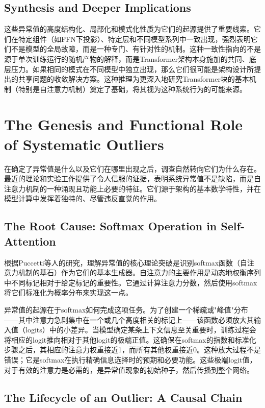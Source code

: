 \documentclass{article}
\begin{document}
\subsection{Synthesis and Deeper Implications}

这些异常值的高度结构化、局部化和模式化性质为它们的起源提供了重要线索。它们在特定组件（如FFN下投影）、特定层和不同模型系列中一致出现，强烈表明它们不是模型的全局故障，而是一种专门、有针对性的机制。这种一致性指向的不是源于单次训练运行的随机产物的解释，而是Transformer架构本身施加的共同、底层压力。如果相同的模式在不同模型中独立出现，那么它们很可能是架构设计所提出的共享问题的收敛解决方案。这种推理为更深入地研究Transformer块的基本机制（特别是自注意力机制）奠定了基础，将其视为这种系统行为的可能来源。

\section{The Genesis and Functional Role of Systematic Outliers}

在确定了异常值是什么以及它们在哪里出现之后，调查自然转向它们为什么存在。最近的理论和实验工作提供了令人信服的证据，表明系统异常值不是缺陷，而是自注意力机制的一种涌现且功能上必要的特征。它们源于架构的基本数学特性，并在模型计算中发挥着独特的、尽管违反直觉的作用。

\subsection{The Root Cause: Softmax Operation in Self-Attention}

根据Puccetti等人\cite{pucetti2021}的研究，理解异常值的核心理论突破是识别softmax函数（自注意力机制的基石）作为它们的基本生成器。自注意力的主要作用是动态地权衡序列中不同标记相对于给定标记的重要性。它通过计算注意力分数，然后使用softmax将它们标准化为概率分布来实现这一点。

异常值的起源在于softmax如何完成这项任务。为了创建一个稀疏或"峰值"分布——其中注意力急剧集中在一个或几个高度相关的标记上——该函数必须放大其输入值（logits）中的小差异。当模型确定某条上下文信息至关重要时，训练过程会将相应的logit推向相对于其他logit的极端正值。这确保在softmax的指数和标准化步骤之后，其相应的注意力权重接近1，而所有其他权重接近0。这种放大过程不是错误；它是softmax在执行精确信息选择时的预期和必要功能。这些极端logit值，对于有效的注意力是必需的，是异常值现象的初始种子，然后传播到整个网络。

\subsection{The Lifecycle of an Outlier: A Causal Chain}
\end{document}
